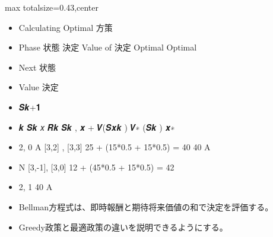 \clearpage
{}
\begin{minipage}[t]{0.405\textwidth}
\begin{adjustbox}{max totalsize={\textwidth}{0.43\textheight},center}
\begin{minipage}{\textwidth}\scriptsize
{}\begin{itemize}
\item Calculating Optimal 方策
\item Phase 状態 決定 Value of 決定 Optimal Optimal
\item Next 状態
\item Value 決定
\item 𝑺𝒌+𝟏
\item 𝒌 𝑺𝒌 𝑥 𝑹𝒌 𝑺𝒌 , 𝒙 + 𝑽(𝑺𝒙𝒌 ) 𝑽∗ (𝑺𝒌 ) 𝒙∗
\item 2, 0 A [3,2] , [3,3] 25 + (15*0.5 + 15*0.5) = 40 40 A
\item N [3,-1], [3,0] 12 + (45*0.5 + 15*0.5) = 42
\item 2, 1 40 A
\end{itemize}\begin{itemize}
\item Bellman方程式は、即時報酬と期待将来価値の和で決定を評価する。
\item Greedy政策と最適政策の違いを説明できるようにする。
\end{itemize}
\end{minipage}
\end{adjustbox}
\end{minipage}\hfill
